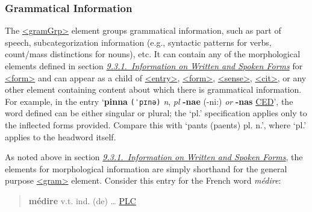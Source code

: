 \subsubsection[{Grammatical Information}]{Grammatical Information}\label{DITPGR}\par
The \hyperref[TEI.gramGrp]{<gramGrp>} element groups grammatical information, such as part of speech, subcategorization information (e.g., syntactic patterns for verbs, count/mass distinctions for nouns), etc. It can contain any of the morphological elements defined in section \textit{\hyperref[DITPFO]{9.3.1.\ Information on Written and Spoken Forms}} for \hyperref[TEI.form]{<form>} and can appear as a child of \hyperref[TEI.entry]{<entry>}, \hyperref[TEI.form]{<form>}, \hyperref[TEI.sense]{<sense>}, \hyperref[TEI.cit]{<cit>}, or any other element containing content about which there is grammatical information. For example, in the entry ‘{\bfseries pinna} \texttt{(ˈpɪnə)} {\itshape n}, {\itshape pl} {\bfseries -nae} (-ni:) {\itshape or} {\bfseries -nas} \hyperref[DIC-CED]{CED}’, the word defined can be either singular or plural; the ‘pl.’ specification applies only to the inflected forms provided. Compare this with ‘pants (paents) pl. n.’, where ‘pl.’ applies to the headword itself.\par
As noted above in section \textit{\hyperref[DITPFO]{9.3.1.\ Information on Written and Spoken Forms}}, the elements for morphological information are simply shorthand for the general purpose \hyperref[TEI.gram]{<gram>} element. Consider this entry for the French word \textit{médire}:  
\begin{quote}{\bfseries médire} v.t. ind. (de) … \hyperref[DIC-PLC]{PLC}\end{quote}
